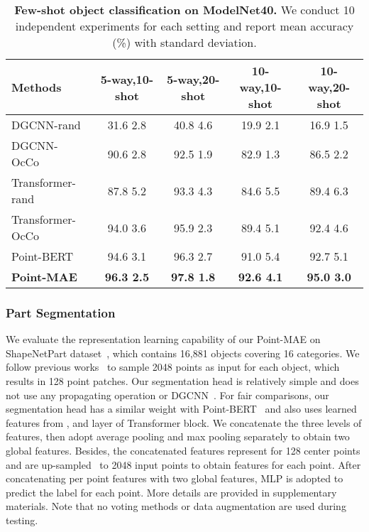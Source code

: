 \documentclass[runningheads]{llncs}
\begin{document}
\begin{table}
\vspace{-3mm}
\begin{center}
\caption{{\bf Few-shot object classification on ModelNet40.} We conduct 10 independent experiments for each setting and report mean accuracy (\%) with standard deviation.}
\setlength\tabcolsep{2pt}
\label{tb:few}
\begin{tabular}{l|cccc}
\hline
Methods & 5-way,10-shot & 5-way,20-shot & 10-way,10-shot &10-way,20-shot  \\

\hline
 DGCNN-rand~\cite{ptocco} & 31.6  2.8 & 40.8  4.6 & 19.9  2.1 & 16.9  1.5\\
 DGCNN-OcCo~\cite{ptocco} & 90.6  2.8 & 92.5  1.9 & 82.9  1.3 & 86.5  2.2\\
 Transformer-rand~\cite{pointbert} & 87.8  5.2 & 93.3  4.3 & 84.6  5.5 & 89.4  6.3\\
 Transformer-OcCo~\cite{pointbert} & 94.0  3.6 & 95.9  2.3 & 89.4  5.1 & 92.4  4.6\\
 Point-BERT~\cite{pointbert} & 94.6  3.1 & 96.3  2.7 & 91.0  5.4 & 92.7  5.1\\
 {\bf Point-MAE} & {\bf 96.3  2.5}&{\bf 97.8  1.8} & {\bf 92.6  4.1} & {\bf 95.0  3.0}\\

\hline
\end{tabular}
\vspace{-10mm}
\end{center}

\end{table}

\vspace{-2mm}
\subsubsection{Part Segmentation}


We evaluate the representation learning capability of our Point-MAE on ShapeNetPart dataset~\cite{shapenetpart}, which contains 16,881 objects covering 16 categories. We follow previous works~\cite{pointnet,pointnet++,pointbert} to sample 2048 points as input for each object, which results in 128 point patches. Our segmentation head is relatively simple and does not use any propagating operation or DGCNN~\cite{ptdgcnn}. For fair comparisons, our segmentation head has a similar weight with Point-BERT~\cite{pointbert} and also uses learned features from ,  and  layer of Transformer block. We concatenate the three levels of features, then adopt average pooling and max pooling separately to obtain two global features. Besides, the concatenated features represent for 128 center points and are up-sampled~\cite{pointnet++} to 2048 input points to obtain features for each point. After concatenating per point features with two global features, MLP is adopted to predict the label for each point. More details are provided in supplementary materials. Note that no voting methods or data augmentation are used during testing.
\end{document}
